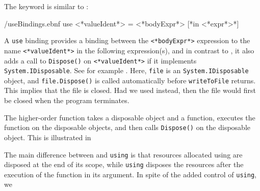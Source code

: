 \documentclass[fsharpNotes.tex]{subfiles}
\begin{document}
The  keyword is similar to :
%
\begin{verbatimwrite}{\ebnf/useBindings.ebnf}
use <*valueIdent*> = <*bodyExpr*> [*in <*expr*>*]
\end{verbatimwrite}
%
A \lstinline{use} binding provides a binding between the \lstinline[language=syntax]{<*bodyExpr*>} expression to the name \lstinline[language=syntax]{<*valueIdent*>} in the following expression(s), and in contrast to , it also adds a call to \lstinline{Dispose()} on \lstinline[language=syntax]{<*valueIdent*>}  if it implements \lstinline{System.IDisposable}. See for example .
%
%
Here, \lstinline{file} is an \lstinline{System.IDisposable} object, and \lstinline{file.Dispose()} is called automatically before \lstinline{writeToFile} returns. This implies that the file is closed. Had we used  instead, then the file would first be closed when the program terminates.

The higher-order function  takes a disposable object and a function, executes the function on the disposable objects, and then calls \lstinline{Dispose()} on the disposable object. This is illustrated in 

%
%
The main difference between  and \lstinline{using} is that resources allocated using  are disposed at the end of its scope, while \lstinline{using} disposes the resources after the execution of the function in its argument. In spite of the added control of \lstinline{using}, we 
\end{document}
